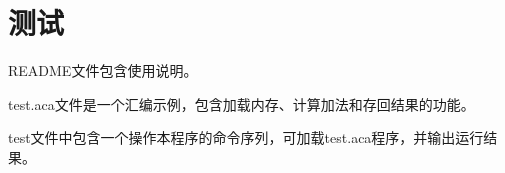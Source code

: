\documentclass{ctexart}
\begin{document}
\section{测试}

    \par README文件包含使用说明。
    \par test.aca文件是一个汇编示例，包含加载内存、计算加法和存回结果的功能。
    \par test文件中包含一个操作本程序的命令序列，可加载test.aca程序，并输出运行结果。
    
\begin{figure}[htb]
\end{figure}
    
\end{document}
